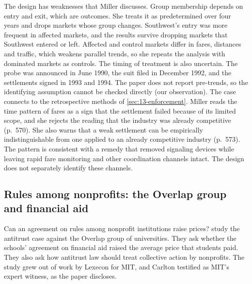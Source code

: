 The design has weaknesses that Miller discusses. Group membership depends on entry and exit, which are outcomes.
She treats it as predetermined over four years and drops markets whose group changes. Southwest's entry was more
frequent in affected markets, and the results survive dropping markets that Southwest entered or left. Affected
and control markets differ in fares, distances and traffic, which weakens parallel trends, so she repeats the
analysis with dominated markets as controls. The timing of treatment is also uncertain. The probe was announced in
June 1990, the suit filed in December 1992, and the settlements signed in 1993 and 1994. The paper does not report
pre-trends, so the identifying assumption cannot be checked directly (our observation). The case connects to the
retrospective methods of \cref{sec:13-enforcement}. Miller reads the time pattern of fares as a sign that the
settlement failed because of its limited scope, and she rejects the reading that the industry was already
competitive (p.~570). She also warns that a weak settlement can be empirically indistinguishable from one applied
to an already competitive industry (p.~573). The pattern is consistent with a remedy that removed signaling devices
while leaving rapid fare monitoring and other coordination channels intact. The design does not separately identify
these channels.

\subsection{Rules among nonprofits: the Overlap group and financial aid}\label{sec:13-overlap}

Can an agreement on rules among nonprofit institutions raise prices? \citet{CarltonBambergerEpstein1995} study the
antitrust case against the Overlap group of universities. They ask whether the schools' agreement on financial aid
raised the average price that students paid. They also ask how antitrust law should treat collective action by
nonprofits. The study grew out of work by Lexecon for MIT, and Carlton testified as MIT's expert witness, as the
paper discloses.

